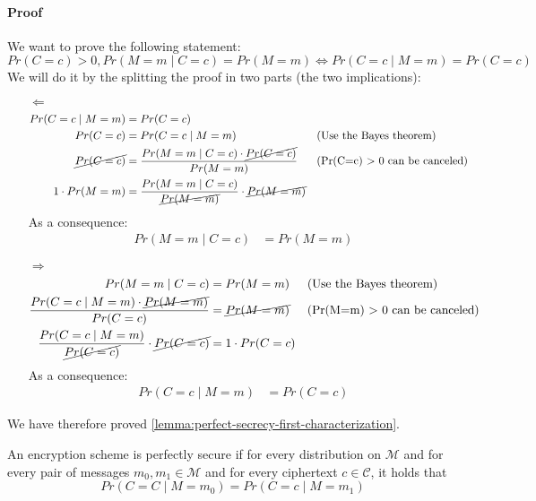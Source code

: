 \documentclass[../main]{subfiles}
\begin{document}
\paragraph{Proof}
We want to prove the following statement:
$$Pr(C=c) > 0, Pr(M=m \mid C=c) = Pr(M=m) \Leftrightarrow{} Pr(C=c \mid M=m) = Pr(C=c)$$
We will do it by the splitting the proof in two parts (the two implications):
\begin{itemize}
    \item[$\Leftarrow$]
        \begin{align*}
            Pr(C=c \mid M=m) &= Pr(C=c) \\
            Pr(C=c) &= Pr(C=c \mid M=m) && \text{(Use the Bayes theorem)} \\
            \cancel{Pr(C=c)} &= \frac{Pr(M=m \mid C=c) \cdot{} \cancel{Pr(C=c)}}{Pr(M=m)} && \text{(Pr(C=c) $>$ 0 can be canceled)} \\
            1 \cdot{} Pr(M=m) &= \frac{Pr(M=m \mid C=c)}{\cancel{Pr(M=m)}} \cdot{} \cancel{Pr(M=m)} \\
        \end{align*}
        As a consequence:
        \begin{align*}
            Pr(M=m \mid C=c) &= Pr(M=m)
        \end{align*}
    \item[$\Rightarrow$]
        \begin{align*}
            Pr(M=m \mid C=c) &= Pr(M=m) && \text{(Use the Bayes theorem)}\\
            \frac{Pr(C=c \mid M=m) \cdot{} \cancel{Pr(M=m)}}{Pr(C=c)} &= \cancel{Pr(M=m)} && \text{(Pr(M=m) $>$ 0 can be canceled)}\\
            \frac{Pr(C=c \mid M=m)}{\cancel{Pr(C=c)}} \cdot{} \cancel{Pr(C=c)} &= 1 \cdot{} Pr(C=c)
        \end{align*}
        As a consequence:
        \begin{align*}
            Pr(C=c \mid M=m) &= Pr(C=c)
        \end{align*}
\end{itemize}


We have therefore proved \ref{lemma:perfect-secrecy-first-characterization}.
\begin{lemma}
    \label{lemma:perfect-secrecy-second-characterization}
    An encryption scheme is perfectly secure if for every distribution on $\mathcal{M}$ and for every pair of messages $m_0, m_1 \in{} \mathcal{M}$ and for every ciphertext $c \in{} \mathcal{C}$, it holds that $$Pr(C=C \mid{} M=m_0) = Pr(C=c \mid{} M = m_1)$$
\end{lemma}
\end{document}
